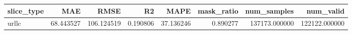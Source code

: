 \begin{tabular}{lrrrrrrr}
\toprule
slice_type & MAE & RMSE & R2 & MAPE & mask_ratio & num_samples & num_valid \\
\midrule
urllc & 68.443527 & 106.124519 & 0.190806 & 37.136246 & 0.890277 & 137173.000000 & 122122.000000 \\
\bottomrule
\end{tabular}
